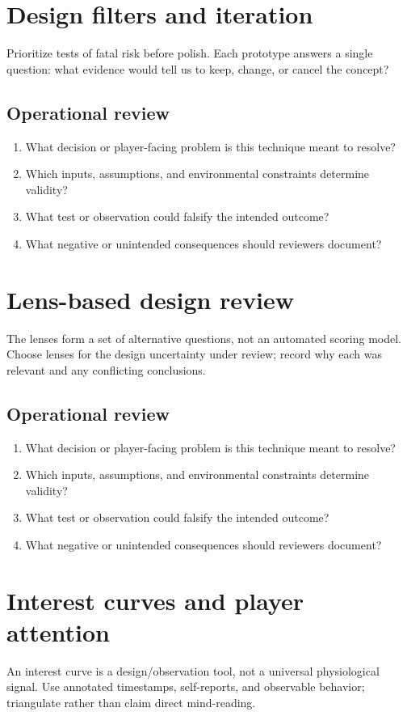 \documentclass[11pt]{article}
\begin{document}
\section{Design filters and iteration}
Prioritize tests of fatal risk before polish. Each prototype answers a single question: what evidence would tell us to keep, change, or cancel the concept?


\subsection{Operational review}
\begin{enumerate}
\item What decision or player-facing problem is this technique meant to resolve?
\item Which inputs, assumptions, and environmental constraints determine validity?
\item What test or observation could falsify the intended outcome?
\item What negative or unintended consequences should reviewers document?
\end{enumerate}

\section{Lens-based design review}
The lenses form a set of alternative questions, not an automated scoring model. Choose lenses for the design uncertainty under review; record why each was relevant and any conflicting conclusions.


\subsection{Operational review}
\begin{enumerate}
\item What decision or player-facing problem is this technique meant to resolve?
\item Which inputs, assumptions, and environmental constraints determine validity?
\item What test or observation could falsify the intended outcome?
\item What negative or unintended consequences should reviewers document?
\end{enumerate}

\section{Interest curves and player attention}
An interest curve is a design/observation tool, not a universal physiological signal. Use annotated timestamps, self-reports, and observable behavior; triangulate rather than claim direct mind-reading.
\end{document}

